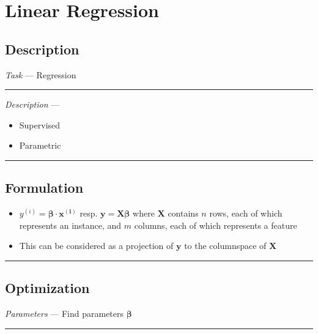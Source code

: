 \section{Linear Regression}
\subsection*{Description}
\emph{Task} --- Regression

{\color{lightgray}\hrule height 0.001mm}

\emph{Description} --- 
\begin{itemize}
    \item Supervised 
    \item Parametric
\end{itemize}

{\color{black}\hrule height 0.001mm}

\subsection*{Formulation}

\begin{itemize}
    \item $y^{(i)} = \boldsymbol{\beta} \cdot \boldsymbol{x^{(i)}}$ resp. $\boldsymbol{y} = \boldsymbol{X}\boldsymbol{\beta}$ where $\boldsymbol{X}$ contains $n$ rows, each of which represents an instance, and $m$ columns, each of which represents a feature
    \item This can be considered as a projection of $\boldsymbol{y}$ to the columnspace of $\boldsymbol{X}$
\end{itemize}

{\color{black}\hrule height 0.001mm}

\subsection*{Optimization}
\emph{Parameters} --- Find parameters $\boldsymbol{\beta}$

{\color{lightgray}\hrule height 0.001mm}


